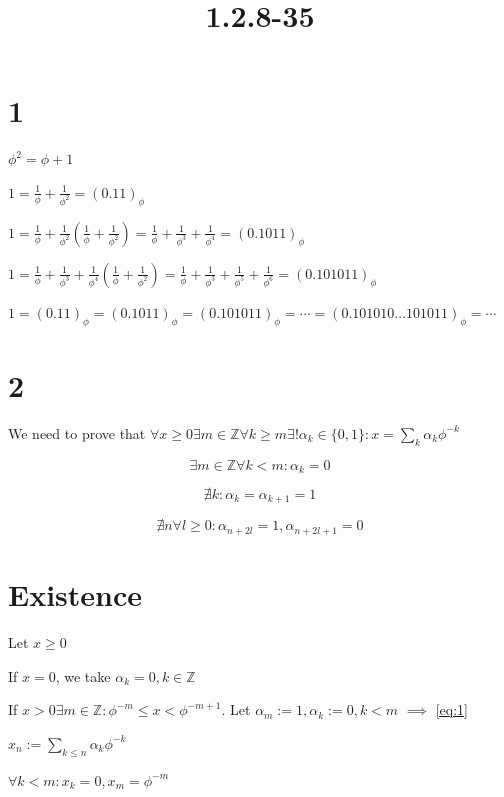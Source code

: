 \documentclass{article}
\title{1.2.8-35}
\begin{document}
\maketitle

\section*{1}

$\phi^2 = \phi + 1$

$1 = \frac{1}{\phi} + \frac{1}{\phi^2} = (0.11)_\phi$

$1 = \frac{1}{\phi} + \frac{1}{\phi^2}(\frac{1}{\phi} + \frac{1}{\phi^2}) = \frac{1}{\phi} + \frac{1}{\phi^3} + \frac{1}{\phi^4} = (0.1011)_\phi$

$1 = \frac{1}{\phi} + \frac{1}{\phi^3} + \frac{1}{\phi^4}(\frac{1}{\phi} + \frac{1}{\phi^2}) = \frac{1}{\phi} + \frac{1}{\phi^3} + \frac{1}{\phi^5} + \frac{1}{\phi^6} = (0.101011)_\phi$

$1 = (0.11)_\phi = (0.1011)_\phi = (0.101011)_\phi = \cdots = (0.101010\ldots 101011)_\phi = \cdots$

\section*{2}

We need to prove that $\forall x \geq 0 \exists m \in \mathbb{Z} \forall k \geq m \exists! \alpha_k \in \{ 0, 1 \}: x = \sum_{k}\alpha_k \phi^{-k}$

\[\exists m \in \mathbb{Z} \forall k < m: \alpha_k = 0 \tag{1}\label{eq:1}\]

\[\nexists k: \alpha_k=\alpha_{k+1} = 1 \tag{2}\label{eq:2}\]

\[\nexists n \forall l\geq 0: \alpha_{n+2l} = 1, \alpha_{n+2l + 1} = 0 \tag{3}\label{eq:3}\]

\section*{Existence}

Let $x \geq 0$

If $x = 0$, we take $\alpha_k = 0, k \in \mathbb{Z}$

If $x > 0 \exists m \in \mathbb{Z}: \phi^{-m} \leq x < \phi^{-m + 1}$. Let $\alpha_m := 1, \alpha_k := 0, k < m$ $\implies$ \eqref{eq:1}

$x_n := \sum_{k \leq n} \alpha_k \phi^{-k}$

$\forall k<m: x_k=0, x_m = \phi^{-m}$
\end{document}
